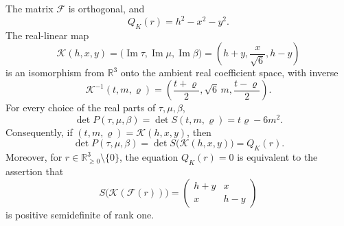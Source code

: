 \begin{theorem}
\label{koide-s6-thm-ambient-discriminant}
The matrix \(\mathcal F\) is orthogonal, and
\begin{equation}
 Q_K(r)=h^2-x^2-y^2.
 \label{koide-s6-eq-lorentz-identity}
\end{equation}
The real-linear map
\begin{equation}
 \mathcal K(h,x,y)
 =\bigl(\operatorname{Im}\tau,
         \operatorname{Im}\mu,
         \operatorname{Im}\beta\bigr)
 =\left(h+y,\frac{x}{\sqrt6},h-y\right)
 \label{koide-s6-eq-coefficient-map}
\end{equation}
is an isomorphism from \(\mathbb R^3\) onto the ambient real coefficient
space, with inverse
\begin{equation}
 \mathcal K^{-1}(t,m,\varrho)
 =\left(\frac{t+\varrho}{2},\sqrt6\,m,
        \frac{t-\varrho}{2}\right).
 \label{koide-s6-eq-coefficient-map-inverse}
\end{equation}
For every choice of the real parts of \(\tau,\mu,\beta\),
\begin{equation}
 \det P(\tau,\mu,\beta)
 =\det S(t,m,\varrho)
 =t\varrho-6m^2.
 \label{koide-s6-eq-canonical-discriminant}
\end{equation}
Consequently, if
\((t,m,\varrho)=\mathcal K(h,x,y)\), then
\begin{equation}
 \det P(\tau,\mu,\beta)
 =\det S\bigl(\mathcal K(h,x,y)\bigr)
 =Q_K(r).
 \label{koide-s6-eq-period-koide-identity}
\end{equation}
Moreover, for \(r\in\mathbb R_{\geq0}^3\setminus\{0\}\), the equation
\(Q_K(r)=0\) is equivalent to the assertion that
\begin{equation}
 S\bigl(\mathcal K(\mathcal F(r))\bigr)
 =\begin{pmatrix}h+y&x\\x&h-y\end{pmatrix}
 \label{koide-s6-eq-positive-sector-matrix}
\end{equation}
is positive semidefinite of rank one.
\end{theorem}

